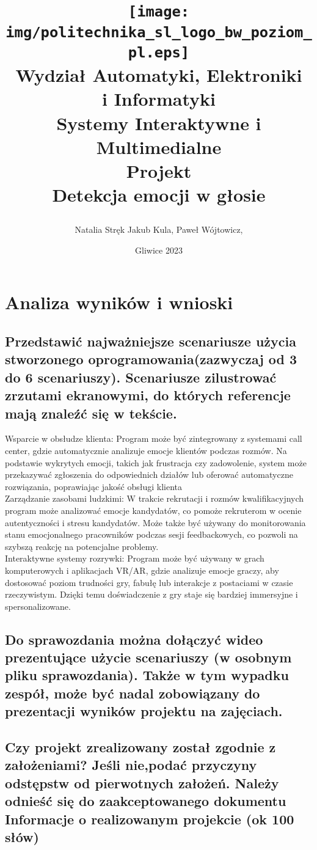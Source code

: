 \documentclass[12pt,titlepage]{article}
\title{
\texttt{[image: img/politechnika\_sl\_logo\_bw\_poziom\_pl.eps]}\\
\textbf{Wydział Automatyki, Elektroniki\\
i Informatyki}\\
\vspace*{1cm}
Systemy Interaktywne i Multimedialne \\ Projekt \\ Detekcja emocji w głosie

\vspace*{5cm}
}
\author{
Natalia Stręk
Jakub Kula,
Paweł Wójtowicz,
}
\date{Gliwice 2023}
\begin{document}
\maketitle


\newpage
\section{Analiza wyników i wnioski}
\subsection{Przedstawić najważniejsze scenariusze użycia stworzonego oprogramowania(zazwyczaj od 3 do 6 scenariuszy). Scenariusze zilustrować zrzutami ekranowymi, do których referencje mają znaleźć się w tekście.}
Wsparcie w obsłudze klienta:
Program może być zintegrowany z systemami call center, gdzie automatycznie analizuje emocje klientów podczas rozmów. Na podstawie wykrytych emocji, takich jak frustracja czy zadowolenie, system może przekazywać zgłoszenia do odpowiednich działów lub oferować automatyczne rozwiązania, poprawiając jakość obsługi klienta\\

Zarządzanie zasobami ludzkimi:
W trakcie rekrutacji i rozmów kwalifikacyjnych program może analizować emocje kandydatów, co pomoże rekruterom w ocenie autentyczności i stresu kandydatów. Może także być używany do monitorowania stanu emocjonalnego pracowników podczas sesji feedbackowych, co pozwoli na szybszą reakcję na potencjalne problemy.\\

Interaktywne systemy rozrywki:
Program może być używany w grach komputerowych i aplikacjach VR/AR, gdzie analizuje emocje graczy, aby dostosować poziom trudności gry, fabułę lub interakcje z postaciami w czasie rzeczywistym. Dzięki temu doświadczenie z gry staje się bardziej immersyjne i spersonalizowane.\\

\subsection{Do sprawozdania można dołączyć wideo prezentujące użycie scenariuszy (w osobnym pliku sprawozdania). Także w tym wypadku zespół, może być nadal zobowiązany do prezentacji wyników projektu na zajęciach.}

\subsection{Czy projekt zrealizowany został zgodnie z założeniami? Jeśli nie,podać przyczyny odstępstw od pierwotnych założeń. Należy odnieść się do zaakceptowanego dokumentu Informacje o realizowanym projekcie (ok 100 słów)}
\end{document}
